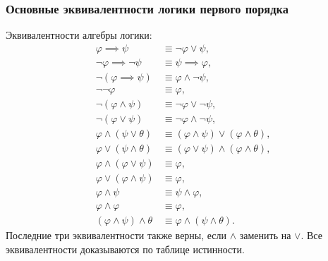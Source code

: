 \documentclass[a4paper, fleqn]{article}
\begin{document}
    \subsubsection{Основные эквивалентности логики первого порядка}
    Эквивалентности алгебры логики:
    \begin{align}
        \varphi \implies \psi &\equiv \neg \varphi \lor \psi, \\
        \neg \varphi \implies \neg \psi &\equiv \psi \implies \varphi, \\
        \neg (\varphi \implies \psi) &\equiv \varphi \land \neg \psi, \\
        \neg \neg \varphi &\equiv \varphi, \\
        \neg (\varphi \land \psi) &\equiv \neg \varphi \lor \neg \psi, \\
        \neg (\varphi \lor \psi) &\equiv \neg \varphi \land \neg \psi, \\
        \varphi \land (\psi \lor \theta) &\equiv  (\varphi \land \psi) \lor (\varphi \land \theta), \\
        \varphi \lor (\psi \land \theta) &\equiv (\varphi \lor \psi) \land (\varphi \land \theta), \\
        \varphi \land (\varphi \lor \psi) &\equiv \varphi, \\
        \varphi \lor (\varphi \land \psi) &\equiv \varphi, \\
        \varphi \land \psi &\equiv \psi \land \varphi, \\
        \varphi \land \varphi &\equiv \varphi, \\
        (\varphi \land \psi) \land \theta &\equiv \varphi \land (\psi \land \theta).
    \end{align}
    Последние три эквивалентности также верны, если $\land$ заменить на $\lor$.
    Все эквивалентности доказываются по таблице истинности.
\end{document}

